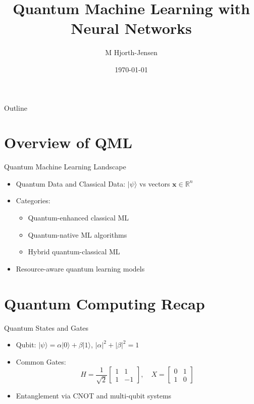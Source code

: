 \documentclass{beamer}
\title[QML with NN]{Quantum Machine Learning with Neural Networks}
\author{M Hjorth-Jensen}
\institute{University of Oslo}
\date{\today}
\begin{document}
\begin{frame}
  \titlepage
\end{frame}

\begin{frame}{Outline}
  \tableofcontents
\end{frame}

\section{Overview of QML}
\begin{frame}{Quantum Machine Learning Landscape}
  \begin{itemize}
    \item Quantum Data and Classical Data: \( |\psi\rangle \) vs vectors \( \mathbf{x} \in \mathbb{R}^n \)
    \item Categories:
    \begin{itemize}
        \item Quantum-enhanced classical ML
        \item Quantum-native ML algorithms
        \item Hybrid quantum-classical ML
    \end{itemize}
    \item Resource-aware quantum learning models
  \end{itemize}
\end{frame}

\section{Quantum Computing Recap}
\begin{frame}{Quantum States and Gates}
  \begin{itemize}
    \item Qubit: \( |\psi\rangle = \alpha|0\rangle + \beta|1\rangle \), \( |\alpha|^2 + |\beta|^2 = 1 \)
    \item Common Gates:
    \[
        H = \frac{1}{\sqrt{2}}\begin{bmatrix}1 & 1\\ 1 & -1\end{bmatrix}, \quad
        X = \begin{bmatrix}0 & 1\\ 1 & 0\end{bmatrix}
    \]
    \item Entanglement via CNOT and multi-qubit systems
  \end{itemize}
\end{frame}
\end{document}
